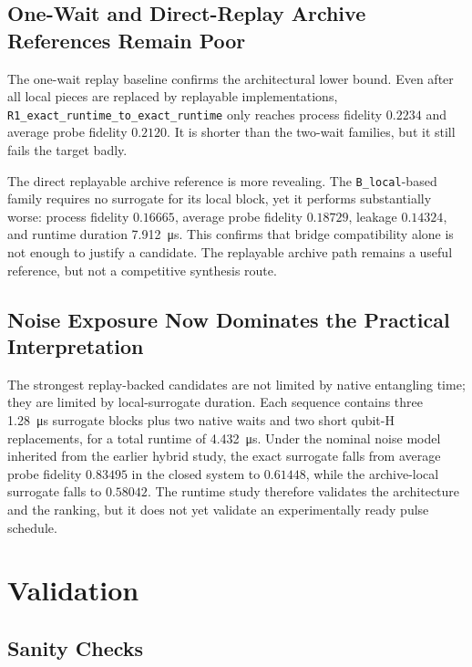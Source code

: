 \documentclass[aps,pra,twocolumn,reprint,amsmath,amssymb]{revtex4-2}
\begin{document}
\subsection{One-Wait and Direct-Replay Archive References Remain Poor}

The one-wait replay baseline confirms the architectural lower bound. Even after
all local pieces are replaced by replayable implementations,
\texttt{R1\_exact\_runtime\_to\_exact\_runtime} only reaches process fidelity
$0.2234$ and average probe fidelity $0.2120$. It is shorter than the two-wait
families, but it still fails the target badly.

The direct replayable archive reference is more revealing. The
\texttt{B\_local}-based family requires no surrogate for its local block, yet it
performs substantially worse: process fidelity $0.16665$, average probe fidelity
$0.18729$, leakage $0.14324$, and runtime duration \SI{7.912}{\micro\second}.
This confirms that bridge compatibility alone is not enough to justify a
candidate. The replayable archive path remains a useful reference, but not a
competitive synthesis route.

\subsection{Noise Exposure Now Dominates the Practical Interpretation}

The strongest replay-backed candidates are not limited by native entangling time;
they are limited by local-surrogate duration. Each sequence contains three
\SI{1.28}{\micro\second} surrogate blocks plus two native waits and two short
qubit-H replacements, for a total runtime of \SI{4.432}{\micro\second}. Under
the nominal noise model inherited from the earlier hybrid study, the exact
surrogate falls from average probe fidelity $0.83495$ in the closed system to
$0.61448$, while the archive-local surrogate falls to $0.58042$. The runtime
study therefore validates the architecture and the ranking, but it does not yet
validate an experimentally ready pulse schedule.

\section{Validation}

\subsection{Sanity Checks}
\end{document}
